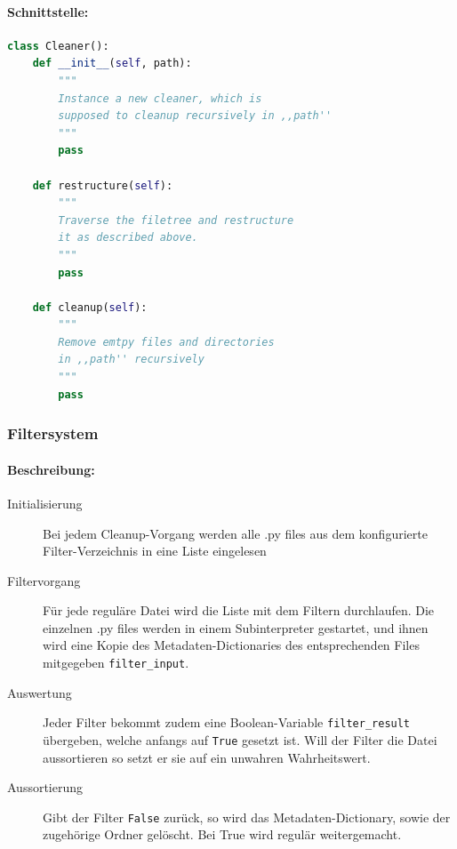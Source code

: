 \paragraph{Schnittstelle:} 
\label{par:schnittstelle_}
\begin{lstlisting}[language=python]
class Cleaner():
    def __init__(self, path):
        """
        Instance a new cleaner, which is
        supposed to cleanup recursively in ,,path''
        """
        pass

    def restructure(self): 
        """
        Traverse the filetree and restructure
        it as described above.
        """
        pass
  
    def cleanup(self):
        """
        Remove emtpy files and directories
        in ,,path'' recursively
        """
        pass
\end{lstlisting}



\subsubsection{Filtersystem}
\label{ssub:filtersystem}
\paragraph{Beschreibung:}
\label{par:beschreibung_}
\begin{description}
  \item[Initialisierung] Bei jedem Cleanup-Vorgang werden alle .py files
    aus dem konfigurierte Filter-Verzeichnis in eine Liste eingelesen
  \item[Filtervorgang] Für jede reguläre Datei wird die Liste mit dem
    Filtern durchlaufen. Die einzelnen .py files werden in einem
    Subinterpreter gestartet, und ihnen wird eine Kopie des
    Metadaten-Dictionaries des entsprechenden Files mitgegeben
    \texttt{filter\_input}.
  \item[Auswertung] Jeder Filter bekommt zudem eine Boolean-Variable
    \texttt{filter\_result} übergeben, welche anfangs auf \texttt{True}
    gesetzt ist. Will der Filter die Datei aussortieren so setzt er sie
    auf ein unwahren Wahrheitswert. 
  \item[Aussortierung] Gibt der Filter \texttt{False} zurück, so wird
    das Metadaten-Dictionary, sowie der zugehörige Ordner gelöscht. 
    Bei True wird regulär weitergemacht.
\end{description}

